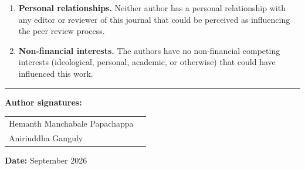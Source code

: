 \documentclass[11pt]{article}
\begin{document}
\begin{enumerate}
\item \textbf{Personal relationships.}
Neither author has a personal relationship with any editor or reviewer of this
journal that could be perceived as influencing the peer review process.

\item \textbf{Non-financial interests.}
The authors have no non-financial competing interests (ideological, personal,
academic, or otherwise) that could have influenced this work.

\end{enumerate}

\bigskip
\noindent\rule{\textwidth}{0.4pt}

\bigskip
\noindent\textbf{Author signatures:}

\bigskip
\noindent\begin{tabular}{ll}
Hemanth Manchabale Papachappa & \underline{\hspace{6cm}} \\[12pt]
Aniriuddha Ganguly             & \underline{\hspace{6cm}} \\
\end{tabular}

\bigskip
\noindent\textbf{Date:} September 2026
\end{document}
